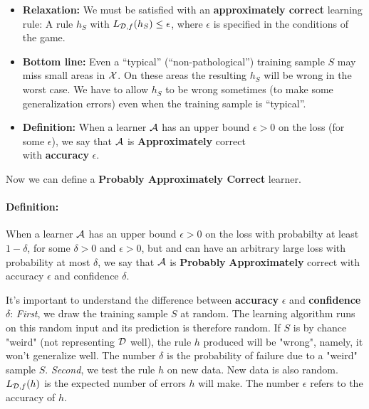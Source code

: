 {\begin{itemize}
    no learner can hope to produce a perfect rule ( a rule $h_S$ with
      $L_{\D,f}(h_S) =
    0$) with probability at least $1-\delta$ regardless of  Nature's strategy.
\item {\bf Relaxation:} We must be satisfied with an {\bf approximately correct}
  learning rule: A rule $h_S$ with $L_{\mathcal{D},f}(h_S) \le
  \epsilon$, where $\epsilon$ is specified in the conditions of the game.
\item {\bf Bottom line:} Even a ``typical'' (``non-pathological'') training sample $S$ may miss small areas in $\mathcal{X}$. On these areas
  the resulting $h_S$ will be wrong in the worst case. We have to allow $h_S$ to
  be wrong sometimes (to make some generalization errors) even when the training sample is ``typical''.
\item {\bf Definition:}  When a learner $\mathcal{A}$ has an upper bound $\epsilon>0$ on
  the loss (for some $\epsilon$), we  say that $\mathcal{A}$ is {\bf Approximately}
  correct \\with {\bf accuracy} $\epsilon$.
\end{itemize}




Now we can define a {\bf Probably Approximately Correct} learner.
  \paragraph{Definition:}
    When a learner $\mathcal{A}$ has an upper bound $\epsilon>0$ on the loss with
    probabilty at least $1-\delta$, for some $\delta>0$ and $\epsilon>0$, 
    but and can have an arbitrary large loss with probability at most
  $\delta$, we say that $\mathcal{A}$ is {\bf Probably} {\bf Approximately} correct with accuracy $\epsilon$ and confidence $\delta$.



It's important to understand the difference between \textbf{accuracy} $\epsilon$ and \textbf{confidence} $\delta$:
\textit{First}, we draw the training sample $S$ at random. The learning algorithm runs on this random input and its prediction is therefore random.
If $S$ is by chance "weird" (not representing $\mathcal{D}$ well), the rule $h$ produced will be "wrong", namely, it won't generalize well. The number $\delta$ is the probability of failure due to a "weird" sample $S$.
\textit{Second}, we test the rule $h$ on new data. New data is also random. $L_{\mathcal{D},f}(h)$ is the expected number of errors $h$ will make. The number $\epsilon$ refers to the accuracy of $h$.

}
